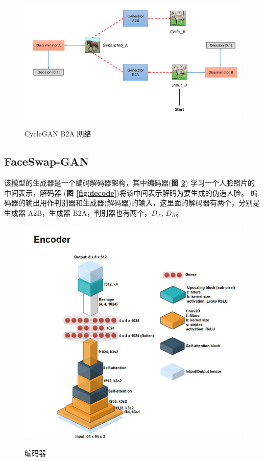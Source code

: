 \begin{figure}[h!]
	\caption{CycleGAN B2A 网络}
	\centering
	\includegraphics[width=\textwidth]{cycleB2A.png}
	\label{fig:cycleB2A}
\end{figure}

\subsection{FaceSwap-GAN}
该模型的生成器是一个编码解码器架构，其中编码器(\textbf{图 \ref{fig:encode}}) 学习一个人脸照片的中间表示，解码器 (\textbf{图 \ref{fig:decode}})将该中间表示解码为要生成的伪造人脸。
编码器的输出用作判别器和生成器(解码器)的输入，这里面的解码器有两个，分别是生成器 A2B，生成器 B2A，判别器也有两个，$D_A$, $D_B$。

\begin{figure}[h!]
	\caption{编码器}
	\centering
	\includegraphics[width=\textwidth]{encode.jpg}
	\label{fig:encode}
\end{figure}

